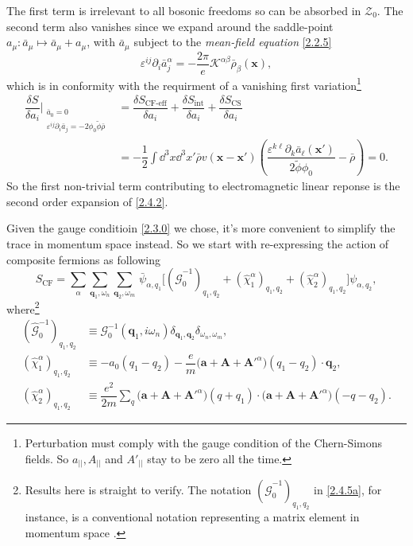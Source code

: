 \documentclass[bachelor,english,numbers]{ustcthesis}
\begin{document}
		The first term is irrelevant to all bosonic freedoms so can be absorbed in $\mathcal{Z}_0$. The second term also vanishes since we expand around the saddle-point $a_\mu: \bar{a}_\mu\mapsto \bar{a}_\mu+a_\mu$, with $\bar{a}_\mu$ subject to the \emph{mean-field equation} \eqref{2.2.5}
		\begin{equation}\label{2.4.3}
			\varepsilon^{ij}\partial_i \bar{a}_j^\alpha=-\dfrac{2\pi}{e}\mathcal{K}^{\alpha \beta}\bar{\rho}_\beta(\bm{x}),
		\end{equation}
		which is in conformity with the requirment of a vanishing first variation\footnote{Perturbation must comply with the gauge condition of the Chern-Simons fields. So $a_{||}, A_{||}$ and $A'_{||}$ stay to be zero all the time.}
		\begin{align*}
			\dfrac{\delta S}{\delta a_i}\bigg|_{\substack{\bar{a}_0=0\\\varepsilon^{ij}\partial_i\bar{a}_j=-2\phi_0\widetilde{\phi}\bar{\rho}}}&=\dfrac{\delta S_{\text{CF-eff}}}{\delta a_i}+\dfrac{\delta S_{\text{int}}}{\delta a_i}+\dfrac{\delta S_{\text{CS}}}{\delta a_i}\\
			&=-\dfrac{1}{2}\int\dd^3 x\dd^3 x' \bar{\rho}v(\bm{x}-\bm{x'})\left(\dfrac{\varepsilon^{k\ell}\partial_k \bar{a}_\ell(\bm{x'})}{2\widetilde{\phi}\phi_0}-\bar{\rho}\right)=0.
		\end{align*}
		So the first non-trivial term contributing to electromagnetic linear reponse is the second order expansion of \eqref{2.4.2}.\par
		Given the gauge conditioin \eqref{2.3.0} we chose, it's more convenient to simplify the trace in momentum space instead. So we start with re-expressing the action of composite fermions as following
		\begin{equation}\label{2.4.4}
			S_{\text{CF}}=\sum_\alpha\sum_{\bm{q}_1,\omega_n}\sum_{\bm{q}_2,\omega_m}\,\bar{\psi}_{\alpha,q_1}\bigg[(\hat{\mathcal{G}}_0^{-1})_{q_1,q_2}+(\hat{\chi}^\alpha_1)_{q_1,q_2}+(\hat{\chi}^\alpha_2)_{q_1,q_2}\bigg]\psi_{\alpha,q_2},
		\end{equation} 
		where\footnote{Results here is straight to verify. The notation $(\hat{\mathcal{G}}_0^{-1})_{q_1,q_2}$ in \eqref{2.4.5a}, for instance, is a conventional notation representing a matrix element in momentum space \cite{altland2010condensed,nagaosa2013quantum}.}
		\begin{subequations} %
		\begin{align}
			(\hat{\mathcal{G}}_0^{-1})_{q_1,q_2}&\equiv \mathcal{G}_0^{-1}(\bm{q}_1,i\omega_n)\delta_{\bm{q}_1,\bm{q}_2}\delta_{\omega_n,\omega_m},\label{2.4.5a}\\
			(\hat{\chi}^\alpha_1)_{q_1,q_2}&\equiv-a_0(q_1-q_2)-\dfrac{e}{m}\bigg(\bm{a}+\bm{A}+\bm{A'}^\alpha\bigg)(q_1-q_2)\cdot \bm{q}_2,\label{2.4.5b}\\
			(\hat{\chi}^\alpha_2)_{q_1,q_2}&\equiv\dfrac{e^2}{2m}\sum_{q}\bigg(\bm{a}+\bm{A}+\bm{A'}^\alpha\bigg)(q+q_1)\cdot \bigg(\bm{a}+\bm{A}+\bm{A'}^\alpha\bigg)(-q-q_2)\label{2.4.5c}.
		\end{align}
		\end{subequations}
\end{document}
